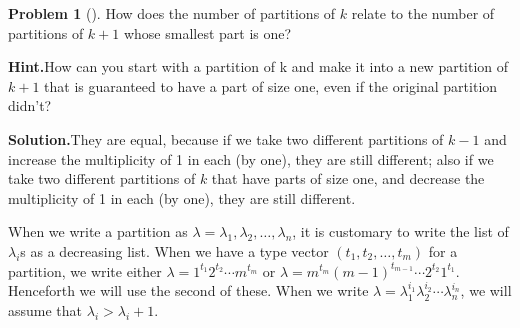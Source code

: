 \documentclass[10pt,]{book}
\theoremstyle{plain}
\theoremstyle{definition}
\newtheorem{activity}[project]{Problem}
\theoremstyle{definition}
\numberwithin{equation}{chapter}
\begin{document}
\begin{activity}[]\label{activity-162}
How does the number of partitions of \(k\) relate to the number of partitions of \(k+1\) whose smallest part is one?%
\par\medskip\noindent%
\textbf{Hint.}\quad How can you start with a partition of k and make it into a new partition of \(k+1\) that is guaranteed to have a part of size one, even if the original partition didn't?%
\par\medskip\noindent%
\textbf{Solution.}\quad They are equal, because if we take two different partitions of \(k-1\) and increase the multiplicity of 1 in each (by one), they are still different; also if we take two different partitions of \(k\) that have parts of size one, and decrease the multiplicity of 1 in each (by one), they are still different.%
\end{activity}
When we write a partition as \(\lambda = \lambda_1,\lambda_2,\ldots,\lambda_n\), it is customary to write the list of \(\lambda_i\)s as a decreasing list. When we have a type vector \((t_1,t_2,\ldots,t_m)\) for a partition, we write either \(\lambda = 1^{t_1}2^{t_2}\cdots m^{t_m}\) or \(\lambda = m^{t_m}(m-1)^{t_{m-1}}\cdots 2^{t_2}1^{t_1}\). Henceforth we will use the second of these. When we write \(\lambda=\lambda_1^{i_1}\lambda_2^{i_2}\cdots\lambda_n^{i_n}\), we will assume that \(\lambda_i>\lambda_i+1\).%
\typeout{************************************************}
\typeout{************************************************}
\end{document}
